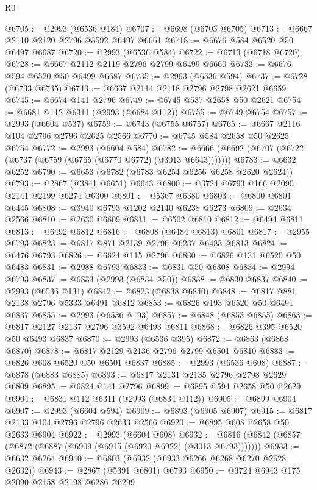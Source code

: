 \begin{lexlean}{R0}
\begin{coremodule}
@6705 := @2993 (@6536 @184)
@6707 := @6698 (@6703 @6705)
@6713 := @6667 @2110 @2120 @2796 @3592 @6497 @6661
@6718 := @6676 @584 @6520 @50 @6497 @6687
@6720 := @2993 (@6536 @584)
@6722 := @6713 (@6718 @6720)
@6728 := @6667 @2112 @2119 @2796 @2799 @6499 @6660
@6733 := @6676 @594 @6520 @50 @6499 @6687
@6735 := @2993 (@6536 @594)
@6737 := @6728 (@6733 @6735)
@6743 := @6667 @2114 @2118 @2796 @2798 @2621 @6659
@6745 := @6674 @141 @2796
@6749 := @6745 @537 @2658 @50 @2621
@6754 := @6681 @112 @6311 (@2993 (@6684 @112))
@6755 := @6749 @6754
@6757 := @2993 (@6604 @537)
@6759 := @6743 (@6755 @6757)
@6765 := @6667 @2116 @104 @2796 @2796 @2625 @2566
@6770 := @6745 @584 @2658 @50 @2625 @6754
@6772 := @2993 (@6604 @584)
@6782 := @6666 (@6692 (@6707 (@6722 (@6737 (@6759 (@6765 (@6770 @6772) (@3013 @6643)))))))
@6783 := @6632 @6252
@6790 := @6653 (@6782 (@6783 @6254 @6256 @6258 @2620 @2624))
@6793 := @2867 (@3841 @6651) @6643
@6800 := @3724 @6793 @166 @2090 @2141 @2199 @6274 @6300
@6801 := @5367 @6380
@6803 := @6800 @6801 @6445
@6808 := @3940 @6793 @1202 @2140 @6238 @6273
@6809 := @2634 @2566
@6810 := @2630 @6809
@6811 := @6502 @6810
@6812 := @6494 @6811
@6813 := @6492 @6812
@6816 := @6808 (@6484 @6813) @6801
@6817 := @2955 @6793
@6823 := @6817 @871 @2139 @2796 @6237 @6483 @6813
@6824 := @6476 @6793
@6826 := @6824 @115 @2796
@6830 := @6826 @131 @6520 @50 @6483
@6831 := @2988 @6793
@6833 := @6831 @50 @6308
@6834 := @2994 @6793
@6837 := @6833 (@2993 (@6834 @50))
@6838 := @6830 @6837
@6840 := @2993 (@6536 @131)
@6842 := @6823 (@6838 @6840)
@6848 := @6817 @881 @2138 @2796 @5333 @6491 @6812
@6853 := @6826 @193 @6520 @50 @6491 @6837
@6855 := @2993 (@6536 @193)
@6857 := @6848 (@6853 @6855)
@6863 := @6817 @2127 @2137 @2796 @3592 @6493 @6811
@6868 := @6826 @395 @6520 @50 @6493 @6837
@6870 := @2993 (@6536 @395)
@6872 := @6863 (@6868 @6870)
@6878 := @6817 @2129 @2136 @2796 @2799 @6501 @6810
@6883 := @6826 @608 @6520 @50 @6501 @6837
@6885 := @2993 (@6536 @608)
@6887 := @6878 (@6883 @6885)
@6893 := @6817 @2131 @2135 @2796 @2798 @2629 @6809
@6895 := @6824 @141 @2796
@6899 := @6895 @594 @2658 @50 @2629
@6904 := @6831 @112 @6311 (@2993 (@6834 @112))
@6905 := @6899 @6904
@6907 := @2993 (@6604 @594)
@6909 := @6893 (@6905 @6907)
@6915 := @6817 @2133 @104 @2796 @2796 @2633 @2566
@6920 := @6895 @608 @2658 @50 @2633 @6904
@6922 := @2993 (@6604 @608)
@6932 := @6816 (@6842 (@6857 (@6872 (@6887 (@6909 (@6915 (@6920 @6922) (@3013 @6793)))))))
@6933 := @6632 @6264
@6940 := @6803 (@6932 (@6933 @6266 @6268 @6270 @2628 @2632))
@6943 := @2867 (@5391 @6801) @6793
@6950 := @3724 @6943 @175 @2090 @2158 @2198 @6286 @6299

\end{coremodule}
\end{lexlean}
